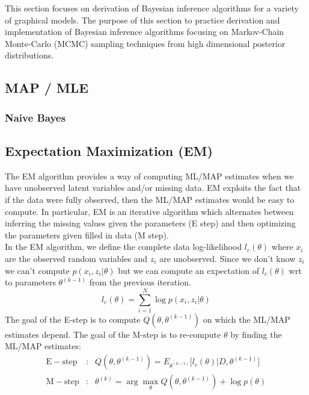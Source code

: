 This section focuses on derivation of Bayesian inference algorithms for a variety of graphical models. The purpose of this section to practice derivation and implementation of Bayesian inference algorithms focusing on Markov-Chain Monte-Carlo (MCMC) sampling techniques from high dimensional posterior distributions. 


\subsection{MAP / MLE}
\subsubsection{Naive Bayes}

\subsection{Expectation Maximization (EM)}

The EM algorithm provides a way of computing ML/MAP estimates when we have unobserved latent variables and/or missing data. EM exploits the fact that if the data were fully observed, then the ML/MAP estimates would be easy to compute. In particular, EM is an iterative algorithm which alternates between inferring the missing values given the parameters (E step) and then optimizing the parameters given filled in data (M step).\\ 

In the EM algorithm, we define the complete data log-likelihood $l_c(\theta)$ where $x_i$ are the observed random variables and $z_i$ are unobserved. Since we don't know $z_i$ we can't compute $p(x_i, z_i|\theta)$ but we can compute an expectation of $l_c(\theta)$ wrt to parameters $\theta^{(k-1)}$ from the previous iteration.  
\begin{equation}
    l_c(\theta) = \sum_{i=1}^{N}\log p(x_i, z_i|\theta) 
\end{equation}
The goal of the E-step is to compute $Q(\theta, \theta^{(k-1)})$ on which the ML/MAP estimates depend. The goal of the M-step is to re-compute $\theta$ by finding the ML/MAP estimates:
\begin{eqnarray}
   \mathrm{E-step} &:& Q(\theta, \theta^{(k-1)}) =  E_{\theta^{(k-1)}}\big[l_c(\theta)|D, \theta^{(k-1)}\big] \\
   \mathrm{M-step} &:& \theta^{(k)} = \arg \max_{\theta}Q(\theta, \theta^{(k-1)}) + \log p(\theta)
\end{eqnarray}

